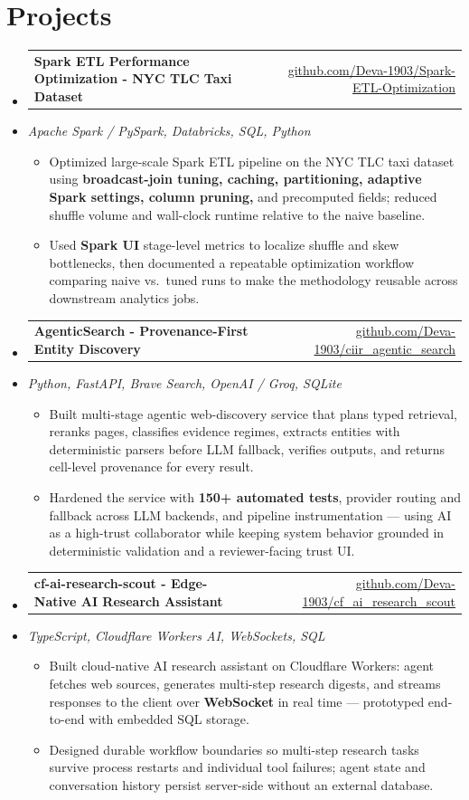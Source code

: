 \documentclass[letterpaper,10pt]{article}
\makeatletter
\newcommand{\resumeItem}[1]{
  \item\small{#1\vspace{-1pt}}
}
\newcommand{\resumeProjectHeading}[2]{
    \item
    \begin{tabular*}{0.985\textwidth}[t]{l@{\extracolsep{\fill}}r}
      \small\textbf{#1} & \small #2 \\
    \end{tabular*}\vspace{-5pt}
}
\newcommand{\resumeProjectSubheading}[1]{
  \vspace{-2pt}\item[] {\small\textcolor{ResumeSlate}{\emph{#1}}}\vspace{-3pt}
}
\newcommand{\resumeSubHeadingListStart}{\begin{itemize}[leftmargin=0.0in, label={}, itemsep=2pt, topsep=2pt]}
\newcommand{\resumeSubHeadingListEnd}{\end{itemize}}
\newcommand{\resumeItemListStart}{\begin{itemize}[leftmargin=0.18in, itemsep=2pt, topsep=1pt]}
\newcommand{\resumeItemListEnd}{\end{itemize}\vspace{-4pt}}
\makeatother
\begin{document}
\section{Projects}
\resumeSubHeadingListStart
  \resumeProjectHeading
    {Spark ETL Performance Optimization - NYC TLC Taxi Dataset}
    {\href{https://github.com/Deva-1903/Spark-ETL-Optimization}{github.com/Deva-1903/Spark-ETL-Optimization}}
  \resumeProjectSubheading{Apache Spark / PySpark, Databricks, SQL, Python}
    \resumeItemListStart
      \resumeItem{Optimized large-scale Spark ETL pipeline on the NYC TLC taxi dataset using \textbf{broadcast-join tuning, caching, partitioning, adaptive Spark settings, column pruning,} and precomputed fields; reduced shuffle volume and wall-clock runtime relative to the naive baseline.}
      \resumeItem{Used \textbf{Spark UI} stage-level metrics to localize shuffle and skew bottlenecks, then documented a repeatable optimization workflow comparing naive vs.\ tuned runs to make the methodology reusable across downstream analytics jobs.}
    \resumeItemListEnd
  \resumeProjectHeading
    {AgenticSearch - Provenance-First Entity Discovery}
    {\href{https://github.com/Deva-1903/ciir_agentic_search}{github.com/Deva-1903/ciir\_agentic\_search}}
  \resumeProjectSubheading{Python, FastAPI, Brave Search, OpenAI / Groq, SQLite}
    \resumeItemListStart
      \resumeItem{Built multi-stage agentic web-discovery service that plans typed retrieval, reranks pages, classifies evidence regimes, extracts entities with deterministic parsers before LLM fallback, verifies outputs, and returns cell-level provenance for every result.}
      \resumeItem{Hardened the service with \textbf{150+ automated tests}, provider routing and fallback across LLM backends, and pipeline instrumentation --- using AI as a high-trust collaborator while keeping system behavior grounded in deterministic validation and a reviewer-facing trust UI.}
    \resumeItemListEnd
  \resumeProjectHeading
    {cf-ai-research-scout - Edge-Native AI Research Assistant}
    {\href{https://github.com/Deva-1903/cf_ai_research_scout}{github.com/Deva-1903/cf\_ai\_research\_scout}}
  \resumeProjectSubheading{TypeScript, Cloudflare Workers AI, WebSockets, SQL}
    \resumeItemListStart
      \resumeItem{Built cloud-native AI research assistant on Cloudflare Workers: agent fetches web sources, generates multi-step research digests, and streams responses to the client over \textbf{WebSocket} in real time --- prototyped end-to-end with embedded SQL storage.}
      \resumeItem{Designed durable workflow boundaries so multi-step research tasks survive process restarts and individual tool failures; agent state and conversation history persist server-side without an external database.}
    \resumeItemListEnd
\resumeSubHeadingListEnd
\vspace{-4pt}
\end{document}
